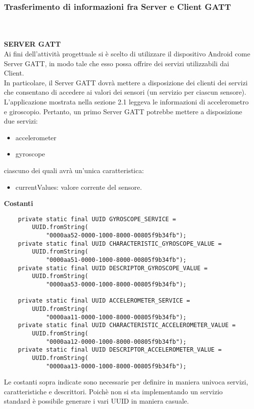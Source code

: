 \documentclass{article}
\begin{document}
\subsubsection{Trasferimento di informazioni fra Server e Client GATT}
\\ \\ \textbf{SERVER GATT}\\
Ai fini dell'attività progettuale si è scelto di utilizzare il dispositivo Android come Server GATT, in modo tale che esso possa offrire dei servizi utilizzabili dai Client.\\
In particolare, il Server GATT dovrà mettere a disposizione dei clienti dei servizi che consentano di accedere ai valori dei sensori (un servizio per ciascun sensore).\\
L'applicazione mostrata nella sezione 2.1 leggeva le informazioni di accelerometro e giroscopio. Pertanto, un primo Server GATT potrebbe mettere a disposizione due servizi:
\begin{itemize}
    \item accelerometer
    \item gyroscope
\end{itemize}
ciascuno dei quali avrà un'unica caratteristica:
\begin{itemize}
    \item currentValues: valore corrente del sensore.
\end{itemize}
\textbf{Costanti}
\begin{lstlisting}
    private static final UUID GYROSCOPE_SERVICE =    
        UUID.fromString(
            "0000aa52-0000-1000-8000-00805f9b34fb");
    private static final UUID CHARACTERISTIC_GYROSCOPE_VALUE = 
        UUID.fromString(
            "0000aa51-0000-1000-8000-00805f9b34fb");
    private static final UUID DESCRIPTOR_GYROSCOPE_VALUE = 
        UUID.fromString(
            "0000aa53-0000-1000-8000-00805f9b34fb");
        
    private static final UUID ACCELEROMETER_SERVICE = 
        UUID.fromString(
            "0000aa11-0000-1000-8000-00805f9b34fb");
    private static final UUID CHARACTERISTIC_ACCELEROMETER_VALUE = 
        UUID.fromString(
            "0000aa12-0000-1000-8000-00805f9b34fb");
    private static final UUID DESCRIPTOR_ACCELEROMETER_VALUE = 
        UUID.fromString(
            "0000aa13-0000-1000-8000-00805f9b34fb");
\end{lstlisting}
Le costanti sopra indicate sono necessarie per definire in maniera univoca servizi, caratteristiche e descrittori. Poichè non si sta implementando un servizio standard è possibile generare i vari UUID in maniera casuale. \\
\end{document}

